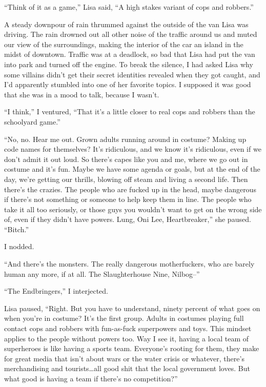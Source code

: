 





``Think of it as a game,'' Lisa said, ``A high stakes variant of cops and robbers.''



A steady downpour of rain thrummed against the outside of the van Lisa was driving.  The rain drowned out all other noise of the traffic around us and muted our view of the surroundings, making the interior of the car an island in the midst of downtown.  Traffic was at a deadlock, so bad that Lisa had put the van into park and turned off the engine.  To break the silence, I had asked Lisa why some villains didn't get their secret identities revealed when they got caught, and I'd apparently stumbled into one of her favorite topics.  I supposed it was good that she was in a mood to talk, because I wasn't.



``I think,'' I ventured, ``That it's a little closer to real cops and robbers than the schoolyard game.''



``No, no.  Hear me out.  Grown adults running around in costume?  Making up code names for themselves?  It's ridiculous, and we know it's ridiculous, even if we don't admit it out loud.  So there's capes like you and me, where we go out in costume and it's fun.  Maybe we have some agenda or goals, but at the end of the day, we're getting our thrills, blowing off steam and living a second life.  Then there's the crazies.  The people who are fucked up in the head, maybe dangerous if there's not something or someone to help keep them in line.  The people who take it all too seriously, or those guys you wouldn't want to get on the wrong side of, even if they didn't have powers.  Lung, Oni Lee, Heartbreaker,'' she paused.  ``Bitch.''



I nodded.



``And there's the monsters.  The really dangerous motherfuckers, who are barely human any more, if at all.  The Slaughterhouse Nine, Nilbog--''



``The Endbringers,'' I interjected.



Lisa paused, ``Right.  But you have to understand, ninety percent of what goes on when you're in costume?  It's the first group.  Adults in costumes playing full contact cops and robbers with fun-as-fuck superpowers and toys.  This mindset applies to the people without powers too.  Way I see it, having a local team of superheroes is like having a sports team.  Everyone's rooting for them, they make for great media that isn't about wars or the water crisis or whatever, there's merchandising and tourists\ldots all good shit that the local government loves.  But what good is having a team if there's no competition?''



